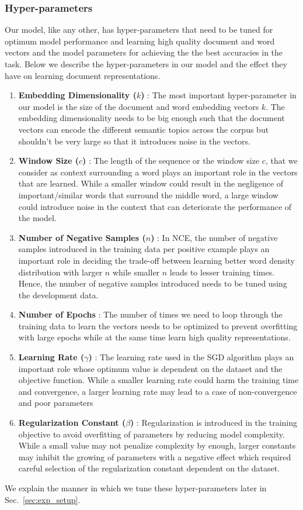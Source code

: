 \subsubsection{Hyper-parameters}
\label{sec:hp_doc}
Our model, like any other, has hyper-parameters that need to be tuned for optimum model performance and learning high quality document and word vectors and the model parameters for achieving the the best accuracies in the task. Below we describe the hyper-parameters in our model and the effect they have on learning document representations.
\begin{enumerate}
\item \textbf{Embedding Dimensionality ($k$)} : The most important hyper-parameter in our model is the size of the document and word embedding vectors $k$. The embedding dimensionality needs to be big enough such that the document vectors can encode the different semantic topics across the corpus but shouldn't be very large so that it introduces noise in the vectors.

\item \textbf{Window  Size ($c$)} : The length of the sequence or the window size $c$, that we consider as context surrounding a word plays an important role in the vectors that are learned. While a smaller window could result in the negligence of important/similar words that surround the middle word, a large window could introduce noise in the context that can deteriorate the performance of the model.

\item \textbf{Number of Negative Samples ($n$)} : In NCE, the number of negative samples introduced in the training data per positive example plays an important role in deciding the trade-off between learning better word density distribution with larger $n$ while smaller $n$ leads to lesser training times. Hence, the number of negative samples introduced needs to be tuned using the development data.

\item \textbf{Number of Epochs} : The number of times we need to loop through the training data to learn the vectors needs to be optimized to prevent overfitting with large epochs while at the same time learn high quality representations.

\item \textbf{Learning Rate ($\gamma$)} : The learning rate used in the SGD algorithm plays an important role whose optimum value is dependent on the dataset and the objective function. While a smaller learning rate could harm the training time and convergence, a larger learning rate may lead to a case of non-convergence and poor parameters

\item \textbf{Regularization Constant ($\beta$)} : Regularization is introduced in the training objective to avoid overfitting of parameters by reducing model complexity. While a small value may not penalize complexity by enough, larger constants may inhibit the growing of parameters with a negative effect which required careful selection of the regularization constant dependent on the dataset.
\end{enumerate}
We explain the manner in which we tune these hyper-parameters later in Sec.~\ref{sec:exp_setup}.




